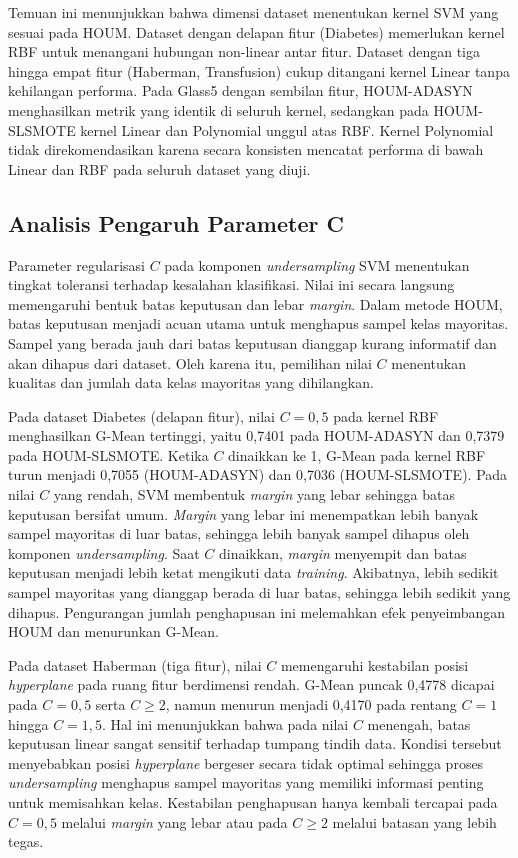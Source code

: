 Temuan ini menunjukkan bahwa dimensi dataset menentukan kernel SVM yang sesuai pada HOUM. Dataset dengan delapan fitur (Diabetes) memerlukan kernel RBF untuk menangani hubungan non-linear antar fitur. Dataset dengan tiga hingga empat fitur (Haberman, Transfusion) cukup ditangani kernel Linear tanpa kehilangan performa. Pada Glass5 dengan sembilan fitur, HOUM-ADASYN menghasilkan metrik yang identik di seluruh kernel, sedangkan pada HOUM-SLSMOTE kernel Linear dan Polynomial unggul atas RBF. Kernel Polynomial tidak direkomendasikan karena secara konsisten mencatat performa di bawah Linear dan RBF pada seluruh dataset yang diuji. \par

\subsection{Analisis Pengaruh Parameter C} \label{IV.Pengaruh_C}
Parameter regularisasi $C$ pada komponen \textit{undersampling} SVM menentukan tingkat toleransi terhadap kesalahan klasifikasi. Nilai ini secara langsung memengaruhi bentuk batas keputusan dan lebar \textit{margin}. Dalam metode HOUM, batas keputusan menjadi acuan utama untuk menghapus sampel kelas mayoritas. Sampel yang berada jauh dari batas keputusan dianggap kurang informatif dan akan dihapus dari dataset. Oleh karena itu, pemilihan nilai $C$ menentukan kualitas dan jumlah data kelas mayoritas yang dihilangkan. \par

Pada dataset Diabetes (delapan fitur), nilai $C=0,5$ pada kernel RBF menghasilkan G-Mean tertinggi, yaitu 0,7401 pada HOUM-ADASYN dan 0,7379 pada HOUM-SLSMOTE. Ketika $C$ dinaikkan ke 1, G-Mean pada kernel RBF turun menjadi 0,7055 (HOUM-ADASYN) dan 0,7036 (HOUM-SLSMOTE). Pada nilai $C$ yang rendah, SVM membentuk \textit{margin} yang lebar sehingga batas keputusan bersifat umum. \textit{Margin} yang lebar ini menempatkan lebih banyak sampel mayoritas di luar batas, sehingga lebih banyak sampel dihapus oleh komponen \textit{undersampling}. Saat $C$ dinaikkan, \textit{margin} menyempit dan batas keputusan menjadi lebih ketat mengikuti data \textit{training}. Akibatnya, lebih sedikit sampel mayoritas yang dianggap berada di luar batas, sehingga lebih sedikit yang dihapus. Pengurangan jumlah penghapusan ini melemahkan efek penyeimbangan HOUM dan menurunkan G-Mean. \par

Pada dataset Haberman (tiga fitur), nilai $C$ memengaruhi kestabilan posisi \textit{hyperplane} pada ruang fitur berdimensi rendah. G-Mean puncak 0,4778 dicapai pada $C=0,5$ serta $C \geq 2$, namun menurun menjadi 0,4170 pada rentang $C=1$ hingga $C=1,5$. Hal ini menunjukkan bahwa pada nilai $C$ menengah, batas keputusan linear sangat sensitif terhadap tumpang tindih data. Kondisi tersebut menyebabkan posisi \textit{hyperplane} bergeser secara tidak optimal sehingga proses \textit{undersampling} menghapus sampel mayoritas yang memiliki informasi penting untuk memisahkan kelas. Kestabilan penghapusan hanya kembali tercapai pada $C=0,5$ melalui \textit{margin} yang lebar atau pada $C \geq 2$ melalui batasan yang lebih tegas. \par

